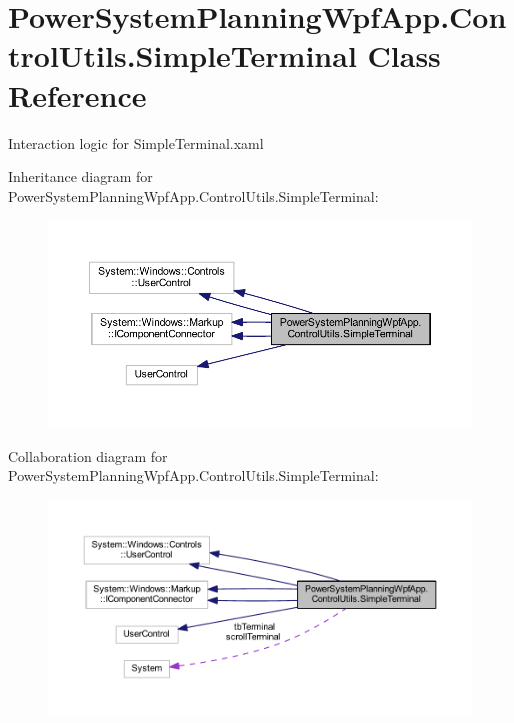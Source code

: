 \hypertarget{class_power_system_planning_wpf_app_1_1_control_utils_1_1_simple_terminal}{}\section{Power\+System\+Planning\+Wpf\+App.\+Control\+Utils.\+Simple\+Terminal Class Reference}
\label{class_power_system_planning_wpf_app_1_1_control_utils_1_1_simple_terminal}


Interaction logic for Simple\+Terminal.\+xaml  




Inheritance diagram for Power\+System\+Planning\+Wpf\+App.\+Control\+Utils.\+Simple\+Terminal\+:\nopagebreak
\begin{figure}[H]
\begin{center}
\leavevmode
\includegraphics[width=350pt]{class_power_system_planning_wpf_app_1_1_control_utils_1_1_simple_terminal__inherit__graph}
\end{center}
\end{figure}


Collaboration diagram for Power\+System\+Planning\+Wpf\+App.\+Control\+Utils.\+Simple\+Terminal\+:\nopagebreak
\begin{figure}[H]
\begin{center}
\leavevmode
\includegraphics[width=350pt]{class_power_system_planning_wpf_app_1_1_control_utils_1_1_simple_terminal__coll__graph}
\end{center}
\end{figure}
